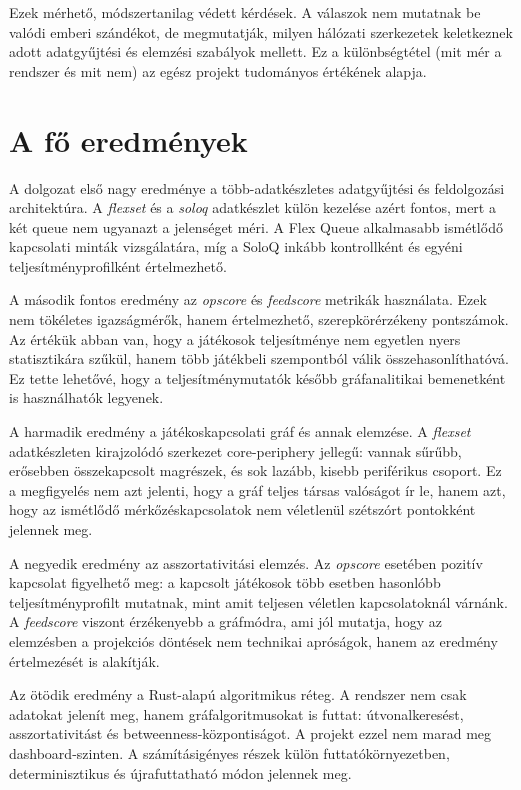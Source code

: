 Ezek mérhető, módszertanilag védett kérdések. A válaszok nem mutatnak be valódi emberi szándékot,
de megmutatják, milyen hálózati szerkezetek keletkeznek adott adatgyűjtési és elemzési szabályok
mellett. Ez a különbségtétel (mit mér a rendszer és mit nem) az egész projekt tudományos
értékének alapja.

\section{A fő eredmények}

A dolgozat első nagy eredménye a több-adatkészletes adatgyűjtési és feldolgozási architektúra.
A \textit{flexset} és a \textit{soloq} adatkészlet külön kezelése azért fontos, mert a két queue
nem ugyanazt a jelenséget méri. A Flex Queue alkalmasabb ismétlődő kapcsolati minták vizsgálatára,
míg a SoloQ inkább kontrollként és egyéni teljesítményprofilként értelmezhető.

A második fontos eredmény az \textit{opscore} és \textit{feedscore} metrikák használata.
Ezek nem tökéletes igazságmérők, hanem értelmezhető, szerepkörérzékeny pontszámok. Az értékük abban
van, hogy a játékosok teljesítménye nem egyetlen nyers statisztikára szűkül, hanem több játékbeli
szempontból válik összehasonlíthatóvá. Ez tette lehetővé, hogy a teljesítménymutatók később
gráfanalitikai bemenetként is használhatók legyenek.

A harmadik eredmény a játékoskapcsolati gráf és annak elemzése. A \textit{flexset} adatkészleten
kirajzolódó szerkezet core-periphery jellegű: vannak sűrűbb, erősebben összekapcsolt magrészek,
és sok lazább, kisebb periférikus csoport. Ez a megfigyelés nem azt jelenti, hogy a gráf teljes
társas valóságot ír le, hanem azt, hogy az ismétlődő mérkőzéskapcsolatok nem véletlenül szétszórt
pontokként jelennek meg.

A negyedik eredmény az asszortativitási elemzés. Az \textit{opscore} esetében pozitív kapcsolat
figyelhető meg: a kapcsolt játékosok több esetben hasonlóbb teljesítményprofilt mutatnak, mint amit
teljesen véletlen kapcsolatoknál várnánk. A \textit{feedscore} viszont érzékenyebb a gráfmódra,
ami jól mutatja, hogy az elemzésben a projekciós döntések nem technikai apróságok, hanem az
eredmény értelmezését is alakítják.

Az ötödik eredmény a Rust-alapú algoritmikus réteg. A rendszer nem csak adatokat jelenít meg,
hanem gráfalgoritmusokat is futtat: útvonalkeresést, asszortativitást és betweenness-központiságot.
A projekt ezzel nem marad meg dashboard-szinten.
A számításigényes részek külön futtatókörnyezetben, determinisztikus és újrafuttatható módon
jelennek meg.

